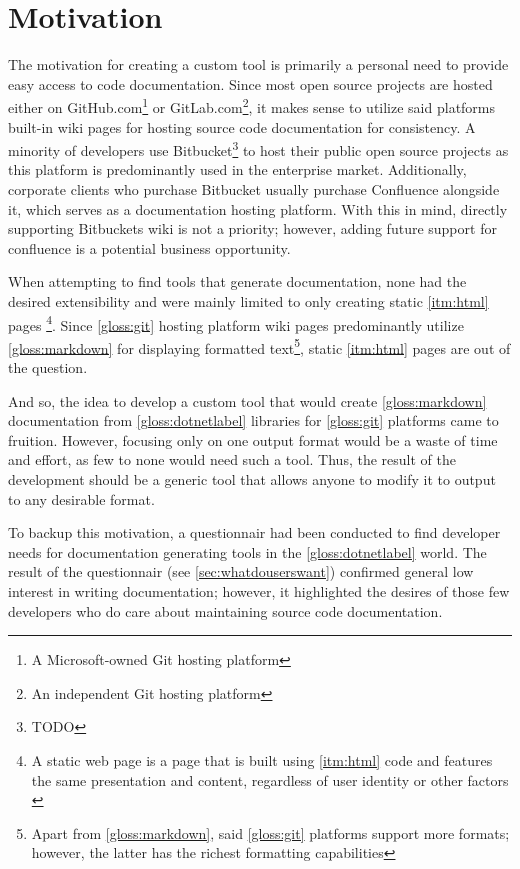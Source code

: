 \section*{Motivation}

The motivation for creating a custom tool is primarily a personal need to provide easy access to code documentation. Since most open source projects are hosted either on GitHub.com\footnote{A Microsoft-owned Git hosting platform} or GitLab.com\footnote{An independent Git hosting platform}, it makes sense to utilize said platforms built-in wiki pages for hosting source code documentation for consistency. A minority of developers use Bitbucket\footnote{TODO} to host their public open source projects as this platform is predominantly used in the enterprise market. Additionally, corporate clients who purchase Bitbucket usually purchase Confluence alongside it, which serves as a documentation hosting platform. With this in mind, directly supporting Bitbuckets wiki is not a priority; however, adding future support for confluence is a potential business opportunity.

When attempting to find tools that generate documentation, none had the desired extensibility and were mainly limited to only creating static \ref{itm:html} pages
\footnote{A static web page is a page that is built using \ref{itm:html} code and features the same presentation and content, regardless of user identity or other factors \cite{techopedia_what_2017}}.
Since \ref{gloss:git} hosting platform wiki pages predominantly utilize \ref{gloss:markdown} for displaying formatted text\footnote{Apart from \ref{gloss:markdown}, said \ref{gloss:git} platforms support more formats; however, the latter has the richest formatting capabilities}, static \ref{itm:html} pages are out of the question.

And so, the idea to develop a custom tool that would create \ref{gloss:markdown} documentation from \ref{gloss:dotnetlabel} libraries for \ref{gloss:git} platforms came to fruition. However, focusing only on one output format would be a waste of time and effort, as few to none would need such a tool. Thus, the result of the development should be a generic tool that allows anyone to modify it to output to any desirable format.

To backup this motivation, a questionnair had been conducted to find developer needs for documentation generating tools in the \ref{gloss:dotnetlabel} world. The result of the questionnair (see \ref{sec:whatdouserswant}) confirmed general low interest in writing documentation; however, it highlighted the desires of those few developers who do care about maintaining source code documentation.

